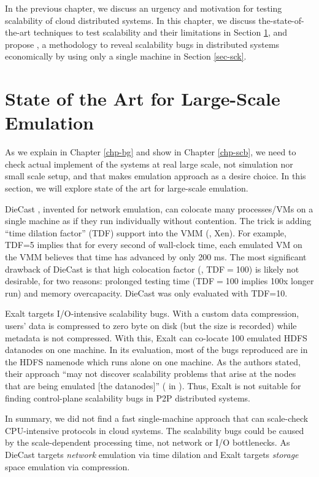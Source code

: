 
In the previous chapter, we discuss an urgency and motivation for testing
scalability of cloud distributed systems. In this chapter, we discuss
the-state-of-the-art techniques to test scalability and their limitations in
Section \ref{mot-state}, and propose \sck, a methodology to reveal scalability bugs in
distributed systems economically by using only a single machine in Section
\ref{sec-sck}. 

\section{State of the Art for Large-Scale Emulation}
\label{mot-state}

As we explain in Chapter \ref{chp-bg} and show in Chapter \ref{chp-scb}, we need
to check actual implement of the systems at real large scale, not simulation nor
small scale setup, and that makes emulation approach as a desire choice. In this
section, we will explore state of the art for large-scale emulation.

%
DieCast \cite{Gupta+08-DieCast}, invented for network emulation, can colocate
many processes/VMs on a single machine as if they run individually without
contention.  The trick is adding ``time dilation factor'' (TDF) support
\cite{Gupta+06-TimeDilation} into the VMM (\eg, Xen).
%
For example, TDF=5 implies that for every second of wall-clock time, each
emulated VM on the VMM believes that time has advanced by only 200 ms.
%
The most significant drawback of DieCast is that high colocation factor (\eg,
TDF$=$100) is likely not desirable, for two reasons: prolonged testing time
(TDF$=$100 implies 100x longer run) and memory overcapacity.  DieCast was only
evaluated with TDF=10.


Exalt \cite{Wang+14-Exalt} targets I/O-intensive scalability bugs.  With a
custom data compression, users' data is compressed to zero byte on disk (but the
size is recorded) while metadata is not compressed.  With this, Exalt can
co-locate 100 emulated HDFS datanodes on one machine.  In its evaluation, most
of the bugs reproduced are in the HDFS namenode which runs alone on one machine.
As the authors stated, their approach ``may not discover scalability problems
that arise at the nodes that are being emulated [the datanodes]'' ( in
\cite{Wang+14-Exalt}).  Thus, Exalt is not suitable for finding control-plane
scalability bugs in P2P distributed systems. 



In summary, we did not find a fast single-machine approach that can scale-check
CPU-intensive protocols in cloud systems.
%
The scalability bugs could be caused by the scale-dependent processing time, not
network or I/O bottlenecks.  As DieCast targets {\em network} emulation via time
dilation and Exalt targets {\em storage} space emulation via compression. 


